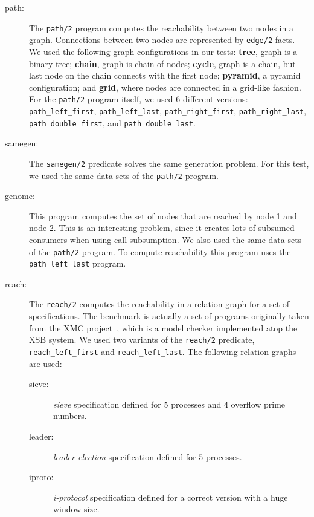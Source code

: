 \begin{description}
   
   \item[path:] The \texttt{path/2} program computes the reachability between two nodes in a graph.
   Connections between two nodes are represented by \texttt{edge/2} facts.
   We used the following graph configurations in our tests: \textbf{tree}, graph is a
   binary tree; \textbf{chain}, graph is chain of nodes; \textbf{cycle}, graph is a chain, but
   last node on the chain connects with the first node; \textbf{pyramid}, a pyramid configuration;
   and \textbf{grid}, where nodes are connected in a grid-like fashion.
   For the \texttt{path/2} program itself, we used 6 different versions: \texttt{path\_left\_first},
   \texttt{path\_left\_last}, \texttt{path\_right\_first}, \texttt{path\_right\_last},
   \texttt{path\_double\_first}, and \texttt{path\_double\_last}.
    
   \item[samegen:] The \texttt{samegen/2} predicate solves the same generation problem.
   For this test, we used the same data sets of the \texttt{path/2} program.
   
   \item[genome:] This program computes the set of nodes that are reached by node 1 and node 2.
   This is an interesting problem, since it creates lots of subsumed consumers when using
   call subsumption. We also used the same data sets of the \texttt{path/2} program.
   To compute reachability this program uses the \texttt{path\_left\_last} program.
   
   \item[reach:] The \texttt{reach/2} computes the reachability in a relation graph for a set of
   specifications. The benchmark is actually a set of programs originally taken from the
   XMC project~\cite{system-xmc,RamakrishnanCR-00}, which is a model checker implemented
   atop the XSB system. We used two variants of the \texttt{reach/2} predicate,
   \texttt{reach\_left\_first} and \texttt{reach\_left\_last}.
   The following relation graphs are used:
   
      \begin{description}
         
         \item[sieve:] \emph{sieve} specification defined for 5 processes and 4 overflow prime numbers.
         
         \item[leader:] \emph{leader election} specification defined for 5 processes.
         
         \item[iproto:] \emph{i-protocol} specification defined for a correct version with a huge window size.

      \end{description}
\end{description}

